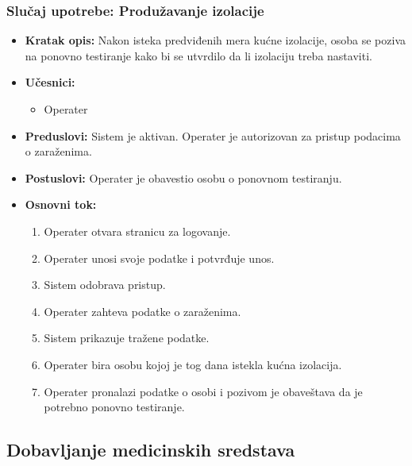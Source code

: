 \documentclass[titlepage]{article}
\begin{document}
\subsubsection{Slučaj upotrebe: Produžavanje izolacije}
\begin{itemize}
    \item \textbf{Kratak opis:} Nakon isteka predviđenih mera kućne izolacije, osoba se poziva na ponovno testiranje kako bi se utvrdilo da li izolaciju treba nastaviti.
    \item \textbf{Učesnici:}
        \begin{itemize}
            \item Operater
        \end{itemize}
    \item \textbf{Preduslovi:} Sistem je aktivan. Operater je autorizovan za pristup podacima o zaraženima.
    \item \textbf{Postuslovi:} Operater je obavestio osobu o ponovnom testiranju.
    \item \textbf{Osnovni tok:}
        \begin{enumerate}
            \item Operater otvara stranicu za logovanje.
            \item Operater unosi svoje podatke i potvrđuje unos.
            \item Sistem odobrava pristup.
            \item Operater zahteva podatke o zaraženima.
            \item Sistem prikazuje tražene podatke.
            \item Operater bira osobu kojoj je tog dana istekla kućna izolacija.
            \item Operater pronalazi podatke o osobi i pozivom je obaveštava da je potrebno ponovno testiranje.
        \end{enumerate}
\end{itemize}

\subsection{Dobavljanje medicinskih sredstava}
\end{document}
